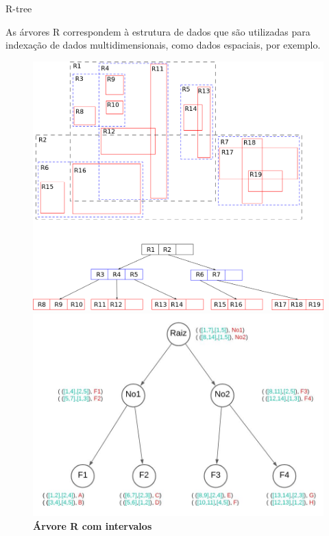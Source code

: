 \documentclass[compress,aspectratio=169]{beamer}
\begin{document}
\begin{frame}{R-tree}
    \par As árvores R correspondem à estrutura de dados que são utilizadas para indexação de dados multidimensionais, como dados espaciais, por exemplo.

    \begin{figure}[htbp]
    \centering
    \begin{minipage}{0.4\textwidth}
        \includegraphics[width=\linewidth]{R-tree.svg.png}
        \caption{\textbf{Árvore R retangular 2D}}
        \label{fig:fig1}
    \end{minipage}\hfill
    \begin{minipage}{0.45\textwidth}
        \includegraphics[width=\linewidth]{Rtreeexemplo.JPG}
        \caption{\textbf{Árvore R com intervalos}}
        \label{fig:fig2}
    \end{minipage}
    \end{figure}
\end{frame}
\end{document}
